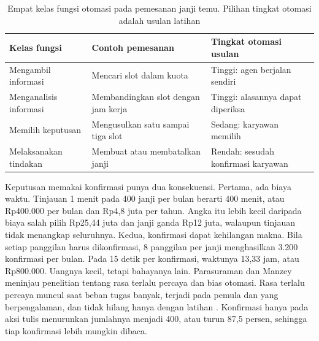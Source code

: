 \begin{table}[!htb]
  \centering
  \caption{Empat kelas fungsi otomasi pada pemesanan janji temu. Pilihan tingkat otomasi adalah usulan latihan}
  \label{tab:ch14-otomasi}
  \footnotesize
  \begin{tabularx}{\textwidth}{H{3.2cm}GG}
    \hline
    \textbf{Kelas fungsi} & \textbf{Contoh pemesanan} & \textbf{Tingkat otomasi usulan} \\ \hline
    Mengambil informasi & Mencari slot dalam kuota & Tinggi: agen berjalan sendiri \\ \hline
    Menganalisis informasi & Membandingkan slot dengan jam kerja & Tinggi: alasannya dapat diperiksa \\ \hline
    Memilih keputusan & Mengusulkan satu sampai tiga slot & Sedang: karyawan memilih \\ \hline
    Melaksanakan tindakan & Membuat atau membatalkan janji & Rendah: sesudah konfirmasi karyawan \\ \hline
  \end{tabularx}
\end{table}

Keputusan memakai konfirmasi punya dua konsekuensi. Pertama, ada biaya waktu. Tinjauan 1 menit pada 400 janji per bulan berarti 400 menit, atau Rp400.000 per bulan dan Rp4,8 juta per tahun. Angka itu lebih kecil
daripada biaya salah pilih Rp25,44 juta dan janji ganda Rp12 juta, walaupun tinjauan tidak menangkap seluruhnya. Kedua, konfirmasi dapat kehilangan makna. Bila setiap panggilan harus dikonfirmasi, 8 panggilan per janji
menghasilkan 3.200 konfirmasi per bulan. Pada 15 detik per konfirmasi, waktunya 13,33 jam, atau Rp800.000. Uangnya kecil, tetapi bahayanya lain. Parasuraman dan Manzey meninjau penelitian tentang rasa terlalu percaya dan
bias otomasi. Rasa terlalu percaya muncul saat beban tugas banyak, terjadi pada pemula dan yang berpengalaman, dan tidak hilang hanya dengan latihan \cite{c14-parasuraman2010}. Konfirmasi hanya pada aksi tulis menurunkan jumlahnya
menjadi 400, atau turun 87,5 persen, sehingga tiap konfirmasi lebih mungkin dibaca.

